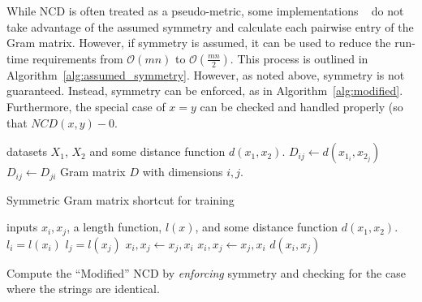 \documentclass[conference]{IEEEtran}
\begin{document}
While NCD is often treated as a pseudo-metric, some implementations ~\cite{jiang2022less} do not take advantage of the assumed symmetry and calculate each pairwise entry of the Gram matrix. 
However, if symmetry is assumed, it can be used to reduce the run-time requirements from $\mathcal{O}(mn)$ to $\mathcal{O}(\frac{mn}{2})$.
This process is outlined in Algorithm~\ref{alg:assumed_symmetry}.
However, as noted above, symmetry is not guaranteed. 
Instead, symmetry can be enforced, as in Algorithm~\ref{alg:modified}. 
Furthermore, the special case of $x=y$ can be checked and handled properly (so that $NCD(x,y) - 0$.

\begin{algorithm}
    \begin{algorithmic}
        \Require datasets $X_1$, $X_2$ and some distance function $d(x_1,x_2)$.
             
                \State $D_{ij} \gets d(x_{1_i},x_{2_j})$
                \State $D_{ij} \gets D_{ji}$ 
            \EndFor
        \EndFor
        \State \Return Gram matrix $D$ with dimensions $i,j$.
    \end{algorithmic}
    \caption{Symmetric Gram matrix shortcut for training}
    \label{alg:symmetric}
\end{algorithm}


\begin{algorithm}
    \begin{algorithmic}
        \Require inputs $x_i, x_j$, a length function, $l(x)$, and some distance function $d(x_1,x_2)$.
         
            \State {}
        \Else  {}
            \State $l_i = l(x_i)$
            \State $l_j = l(x_j)$
                 \State $x_i, x_j \gets x_j, x_i$ 
                 
                     \State $x_i, x_j \gets x_j, x_i$ 
                \EndIf
            \EndIf
            \State \Return $d(x_i, x_j)$
        \EndIf
    \end{algorithmic}
    \caption{Compute the ``Modified'' NCD by \textit{enforcing} symmetry and checking for the case where the strings are identical.}
    \label{alg:modified}
\end{algorithm}
\end{document}

